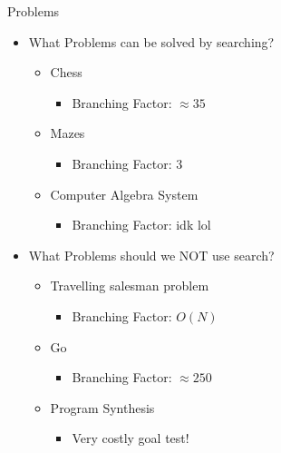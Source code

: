 \documentclass[presentation]{beamer}
\begin{document}
\begin{frame}{Problems}
  \begin{itemize}
  \item What Problems can be solved by searching?
    \begin{itemize}
    \item <1-> Chess
      \begin{itemize}
      \item <7-> Branching Factor: $\approx 35$
      \end{itemize}
    \item <2-> Mazes
      \begin{itemize}
      \item <8-> Branching Factor: $3$
      \end{itemize}
    \item <3-> Computer Algebra
      System
      \begin{itemize}
      \item <9-> Branching Factor:
        idk lol
      \end{itemize}
    \end{itemize}
  \item What Problems should we NOT use search?
    \begin{itemize}
    \item <4-> Travelling salesman problem
      \begin{itemize}
      \item <10-> Branching Factor: $O(N)$
      \end{itemize}
    \item <5-> Go
      \begin{itemize}
      \item <11-> Branching Factor: $\approx 250$
      \end{itemize}
    \item <6-> Program Synthesis
      \begin{itemize}
      \item <12-> Very costly goal test!
      \end{itemize}
    \end{itemize}
  \end{itemize}
\end{frame}
\end{document}
